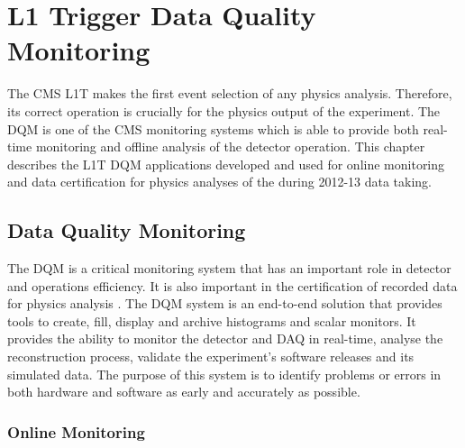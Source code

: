 \chapter{L1 Trigger Data Quality Monitoring}
\label{CHAPTER:TechnicalWork}



The \gls{CMS} \gls{L1T} makes the first event selection of any physics analysis. Therefore, its correct operation is crucially for the physics output of the experiment. The \gls{DQM} is one of the \gls{CMS} monitoring systems which is able to provide both real-time monitoring and offline analysis of the detector operation. This chapter describes the \gls{L1T} \gls{DQM} applications developed and used for online monitoring and data certification for physics analyses of the during 2012-13 data taking.

\section{Data Quality Monitoring}
\label{SECTION:TechnicalWork_DataQualityMonitoring}


The \gls{DQM} is a critical monitoring system that has an important role in detector and operations efficiency. It is also important in the certification of recorded data for physics analysis \cite{CMSTDR:CMSTridasTDRVol1,ARTICLE:CMSDataQualityMonitoringSoftWare_ExperienceAndFuture}. The \gls{DQM} system is an end-to-end solution that provides tools to create, fill, display and archive histograms and scalar monitors. It provides the ability to monitor the detector and \gls{DAQ} in real-time, analyse the reconstruction process, validate the experiment's software releases and its simulated data. The purpose of this system is to identify problems or errors in both hardware and software as early and accurately as possible.

\subsection{Online Monitoring}
\label{SECTION:TechnicalWork_DataQualityMonitoring_OnlineMonitoring}

